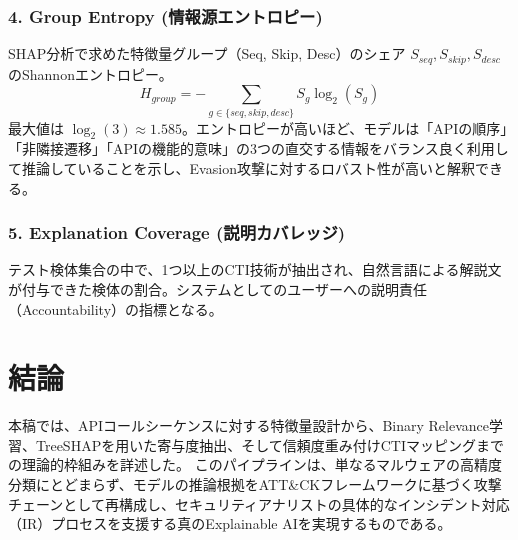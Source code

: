 \documentclass[11pt,a4paper,dvipdfmx]{article}
\begin{document}
\subsubsection{4. Group Entropy (情報源エントロピー)}
SHAP分析で求めた特徴量グループ（Seq, Skip, Desc）のシェア $S_{seq}, S_{skip}, S_{desc}$ のShannonエントロピー。
\begin{equation}
    H_{group} = -\sum_{g \in \{seq, skip, desc\}} S_g \log_2(S_g)
\end{equation}
最大値は $\log_2(3) \approx 1.585$。エントロピーが高いほど、モデルは「APIの順序」「非隣接遷移」「APIの機能的意味」の3つの直交する情報をバランス良く利用して推論していることを示し、Evasion攻撃に対するロバスト性が高いと解釈できる。

\subsubsection{5. Explanation Coverage (説明カバレッジ)}
テスト検体集合の中で、1つ以上のCTI技術が抽出され、自然言語による解説文が付与できた検体の割合。システムとしてのユーザーへの説明責任（Accountability）の指標となる。

\section{結論}
本稿では、APIコールシーケンスに対する特徴量設計から、Binary Relevance学習、TreeSHAPを用いた寄与度抽出、そして信頼度重み付けCTIマッピングまでの理論的枠組みを詳述した。
このパイプラインは、単なるマルウェアの高精度分類にとどまらず、モデルの推論根拠をATT\&CKフレームワークに基づく攻撃チェーンとして再構成し、セキュリティアナリストの具体的なインシデント対応（IR）プロセスを支援する真のExplainable AIを実現するものである。
\end{document}
